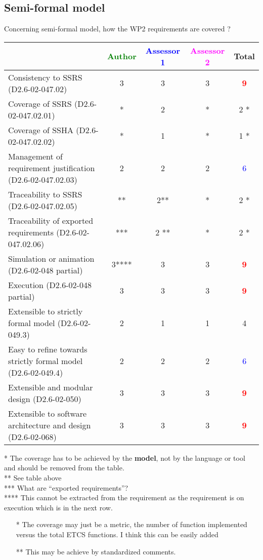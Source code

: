 \subsection{Semi-formal model}

Concerning semi-formal model, how the WP2 requirements are covered ?

\begin{tabular}{|l | c | c | c | c|}
\hline
& \textcolor{green}{Author} & \textcolor{blue}{Assessor 1} & \textcolor{magenta}{Assessor 2} & Total \\
\hline
Consistency to SSRS (D2.6-02-047.02) &3 &3 &3 & \textcolor{red}{\textbf{9}} \\
\hline
Coverage of SSRS (D2.6-02-047.02.01) &* &2 &* & 2    * \\
\hline
Coverage of SSHA (D2.6-02-047.02.02) &* &1 &* & 1    * \\
\hline
Management of requirement justification (D2.6-02-047.02.03) &2 &2 &2 & \textcolor{blue}{6} \\
\hline
Traceability to SSRS (D2.6-02-047.02.05) &** &2** &* & 2    * \\
\hline
Traceability of exported requirements (D2.6-02-047.02.06) &*** & 2    **&* & 2    * \\
\hline
Simulation or animation (D2.6-02-048 partial) &3**** & 3     &3 & \textcolor{red}{\textbf{9}} \\
\hline
Execution (D2.6-02-048 partial) &3 &3 &3 & \textcolor{red}{\textbf{9}} \\
\hline
Extensible to strictly formal model (D2.6-02-049.3) &2 &1 &1 & 4     \\
\hline
Easy to refine towards strictly formal model (D2.6-02-049.4) &2 &2 &2 & \textcolor{blue}{6} \\
\hline
Extensible and modular design (D2.6-02-050) &3 &3 &3 & \textcolor{red}{\textbf{9}} \\
\hline
Extensible to software architecture and design (D2.6-02-068) &3 &3 &3 & \textcolor{red}{\textbf{9}} \\
\hline
\end{tabular}

\begin{author_comment}
* The coverage has to be achieved by the \textbf{model}, not by the language or tool and should be removed from the table.\\
** See table above\\
*** What are ``exported requirements''?\\
**** This cannot be extracted from the requirement as the requirement is on execution which is in the next row.
\end{author_comment}
\begin{assessor1}
\begin{itemize}
\item[*] The coverage may just be a metric, the number of function
  implemented versus the total ETCS functions. I think this can be
  easily added
\item[**] This may be achieve by standardized comments.
\end{itemize}
\end{assessor1}

